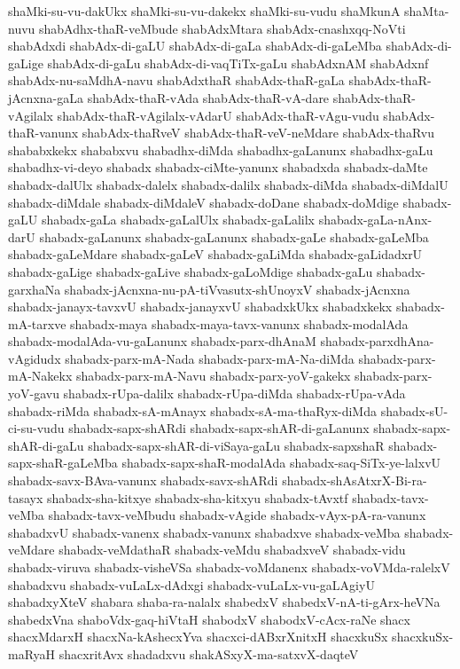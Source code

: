{shaMki-su-vu-dakUkx
shaMki-su-vu-dakekx
shaMki-su-vudu
shaMkunA
shaMta-nuvu
shabAdhx-thaR-veMbude
shabAdxMtara
shabAdx-cnashxqq-NoVti
shabAdxdi
shabAdx-di-gaLU
shabAdx-di-gaLa
shabAdx-di-gaLeMba
shabAdx-di-gaLige
shabAdx-di-gaLu
shabAdx-di-vaqTiTx-gaLu
shabAdxnAM
shabAdxnf
shabAdx-nu-saMdhA-navu
shabAdxthaR
shabAdx-thaR-gaLa
shabAdx-thaR-jAcnxna-gaLa
shabAdx-thaR-vAda
shabAdx-thaR-vA-dare
shabAdx-thaR-vAgilalx
shabAdx-thaR-vAgilalx-vAdarU
shabAdx-thaR-vAgu-vudu
shabAdx-thaR-vanunx
shabAdx-thaRveV
shabAdx-thaR-veV-neMdare
shabAdx-thaRvu
shababxkekx
shababxvu
shabadhx-diMda
shabadhx-gaLanunx
shabadhx-gaLu
shabadhx-vi-deyo
shabadx
shabadx-ciMte-yanunx
shabadxda
shabadx-daMte
shabadx-dalUlx
shabadx-dalelx
shabadx-dalilx
shabadx-diMda
shabadx-diMdalU
shabadx-diMdale
shabadx-diMdaleV
shabadx-doDane
shabadx-doMdige
shabadx-gaLU
shabadx-gaLa
shabadx-gaLalUlx
shabadx-gaLalilx
shabadx-gaLa-nAnx-darU
shabadx-gaLanunx
shabadx-gaLanunx
shabadx-gaLe
shabadx-gaLeMba
shabadx-gaLeMdare
shabadx-gaLeV
shabadx-gaLiMda
shabadx-gaLidadxrU
shabadx-gaLige
shabadx-gaLive
shabadx-gaLoMdige
shabadx-gaLu
shabadx-garxhaNa
shabadx-jAcnxna-nu-pA-tiVvasutx-shUnoyxV
shabadx-jAcnxna
shabadx-janayx-tavxvU
shabadx-janayxvU
shabadxkUkx
shabadxkekx
shabadx-mA-tarxve
shabadx-maya
shabadx-maya-tavx-vanunx
shabadx-modalAda
shabadx-modalAda-vu-gaLanunx
shabadx-parx-dhAnaM
shabadx-parxdhAna-vAgidudx
shabadx-parx-mA-Nada
shabadx-parx-mA-Na-diMda
shabadx-parx-mA-Nakekx
shabadx-parx-mA-Navu
shabadx-parx-yoV-gakekx
shabadx-parx-yoV-gavu
shabadx-rUpa-dalilx
shabadx-rUpa-diMda
shabadx-rUpa-vAda
shabadx-riMda
shabadx-sA-mAnayx
shabadx-sA-ma-thaRyx-diMda
shabadx-sU-ci-su-vudu
shabadx-sapx-shARdi
shabadx-sapx-shAR-di-gaLanunx
shabadx-sapx-shAR-di-gaLu
shabadx-sapx-shAR-di-viSaya-gaLu
shabadx-sapxshaR
shabadx-sapx-shaR-gaLeMba
shabadx-sapx-shaR-modalAda
shabadx-saq-SiTx-ye-lalxvU
shabadx-savx-BAva-vanunx
shabadx-savx-shARdi
shabadx-shAsAtxrX-Bi-ra-tasayx
shabadx-sha-kitxye
shabadx-sha-kitxyu
shabadx-tAvxtf
shabadx-tavx-veMba
shabadx-tavx-veMbudu
shabadx-vAgide
shabadx-vAyx-pA-ra-vanunx
shabadxvU
shabadx-vanenx
shabadx-vanunx
shabadxve
shabadx-veMba
shabadx-veMdare
shabadx-veMdathaR
shabadx-veMdu
shabadxveV
shabadx-vidu
shabadx-viruva
shabadx-visheVSa
shabadx-voMdanenx
shabadx-voVMda-ralelxV
shabadxvu
shabadx-vuLaLx-dAdxgi
shabadx-vuLaLx-vu-gaLAgiyU
shabadxyXteV
shabara
shaba-ra-nalalx
shabedxV
shabedxV-nA-ti-gArx-heVNa
shabedxVna
shaboVdx-gaq-hiVtaH
shabodxV
shabodxV-cAcx-raNe
shacx
shacxMdarxH
shacxNa-kAshecxYva
shacxci-dABxrXnitxH
shacxkuSx
shacxkuSx-maRyaH
shacxritAvx
shadadxvu
shakASxyX-ma-satxvX-daqteV
}
